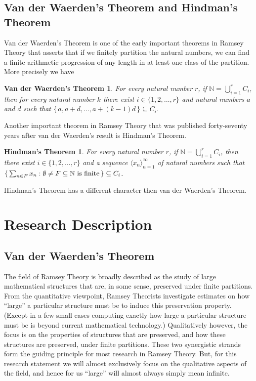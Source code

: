 \documentclass[12pt]{article}
\theoremstyle{plain}
\newtheorem{vdw}[thm]{Van der Waerden's Theorem}
\newtheorem{fst}[thm]{Hindman's Theorem}
\theoremstyle{definition}
\newcommand{\bbN}{\mathbb{N}}
\newcommand{\la}{\langle}
\newcommand{\ra}{\rangle}
\begin{document}
\subsection{Van der Waerden's Theorem and Hindman's Theorem}
Van der Waerden's Theorem is one of the early important theorems in
Ramsey Theory \cite{Van-der-Waerden:1927fk} that asserts that if we
finitely partition the natural numbers, we can find a finite
arithmetic progression of any length in at least one class of the
partition.
More precisely we have
  \begin{vdw}
    For every natural number $r$, if\/ $\bbN = \bigcup_{i=1}^r C_i$,
    then for every natural number $k$ there exist $i \in \{1, 2,
    \ldots, r\}$ and natural numbers $a$ and $d$ such that $\{\, a,
    a+d, \ldots, a+(k-1)d\,\} \subseteq C_i$.
  \end{vdw}
Another important theorem in Ramsey Theory that was published
forty-seventy years after van der Waerden's result is Hindman's
Theorem.
  \begin{fst}
    For every natural number $r$, if\/ $\bbN = \bigcup_{i=1}^r C_i$,
    then there exist $i \in \{1, 2, \ldots, r\}$ and a sequence $\la x_n
    \ra_{n=1}^\infty$ of natural numbers such that $\{\, \sum_{n \in
      F} x_n : \emptyset \ne F \subseteq \bbN \hbox{ is finite} \,\}
    \subseteq C_i$.
  \end{fst}
Hindman's Theorem has a different character then van der Waerden's Theorem.

\section{Research Description}
\subsection{Van der Waerden's Theorem}
The field of Ramsey Theory is broadly described as the study of large
mathematical structures that are, in some sense, preserved under
finite partitions.
From the quantitative viewpoint, Ramsey Theorists investigate
estimates on how ``large'' a particular structure must be to induce
this preservation property.
(Except in a few small cases computing exactly how large a particular
structure must be is beyond current mathematical technology.)
Qualitatively however, the focus is on the properties of structures that are preserved, and how these structures are preserved, under finite partitions.
These two synergistic strands form the guiding principle for most
research in Ramsey Theory.
But, for this research statement we will almost exclusively focus on
the qualitative aspects of the field, and hence for us ``large'' will
almost always simply mean infinite.
\end{document}
